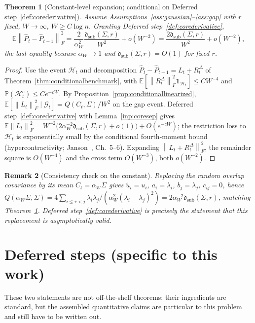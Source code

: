 \documentclass[11pt]{article}
\theoremstyle{tightplain}
\newtheorem{theorem}{Theorem}[section]
\theoremstyle{tightdef}
\newtheorem{remark}[theorem]{Remark}
\newcommand{\E}{\mathbb E}
\newcommand{\Prob}{\mathbb P}
\newcommand{\norm}[1]{\left\lVert #1 \right\rVert}
\newcommand{\one}{\mathbf 1}
\newcommand{\Phat}{\widehat P}
\newcommand{\dsub}{\mathfrak d_{\mathrm{sub}}}
\newcommand{\Gcal}{\mathcal G}
\newcommand{\Hcal}{\mathcal H}
\begin{document}
\begin{theorem}[Constant-level expansion; conditional on Deferred step~\ref{def:corederivative}]\label{thm:conditionalconstant}
Assume Assumptions~\ref{ass:gaussian}--\ref{ass:gap} with $r$ fixed, $W\to\infty$,
$W\ge C\log n$. Granting Deferred step~\ref{def:corederivative},
\[
\E\norm{\Phat_t-\Phat_{t-1}}_F^2
=\frac{2}{\alpha_W^2}\frac{\dsub(\Sigma,r)}{W^2}+o(W^{-2})
=\frac{2\dsub(\Sigma,r)}{W^2}+o(W^{-2}),
\]
the last equality because $\alpha_W\to1$ and $\dsub(\Sigma,r)=O(1)$ for fixed $r$.
\end{theorem}

\begin{proof}
Use the event $\Hcal_t$ and decomposition $\Phat_t-\Phat_{t-1}=L_t+R_t^\Delta$ of
Theorem~\ref{thm:conditionalbenchmark}, with
$\E[\norm{R_t^\Delta}_F^2\one_{\Hcal_t}]\le CW^{-4}$ and $\Prob(\Hcal_t^c)\le Ce^{-cW}$.
By Proposition~\ref{prop:conditionallinearized},
$\E[\norm{L_t}_F^2\mid\Gcal_t]=Q(C_t,\Sigma)/W^2$ on the gap event. Deferred
step~\ref{def:corederivative} with Lemma~\ref{inp:coresep} gives
$\E\norm{L_t}_F^2=W^{-2}\bigl(2\alpha_W^{-2}\dsub(\Sigma,r)+o(1)\bigr)+O(e^{-cW})$; the
restriction loss to $\Hcal_t$ is exponentially small by the conditional
fourth-moment bound (hypercontractivity; Janson~\cite{janson}, Ch.~5--6). Expanding
$\norm{L_t+R_t^\Delta}_F^2$, the remainder square is $O(W^{-4})$ and the cross term
$O(W^{-3})$, both $o(W^{-2})$.
\end{proof}

\begin{remark}[Consistency check on the constant]
Replacing the random overlap covariance by its mean $C_t=\alpha_W\Sigma$ gives
$\widetilde u_i=u_i$, $a_i=\lambda_i$, $b_j=\lambda_j$, $c_{ij}=0$, hence
$Q(\alpha_W\Sigma,\Sigma)=4\sum_{i\le r<j}\lambda_i\lambda_j/(\alpha_W^2(\lambda_i-\lambda_j)^2)
=2\alpha_W^{-2}\dsub(\Sigma,r)$, matching Theorem~\ref{thm:conditionalconstant}.
Deferred step~\ref{def:corederivative} is precisely the statement that this
replacement is asymptotically valid.
\end{remark}

\section{Deferred steps (specific to this work)}\label{sec:deferred}

These two statements are not off-the-shelf theorems: their ingredients are standard,
but the assembled quantitative claims are particular to this problem and still have to
be written out.
\end{document}
